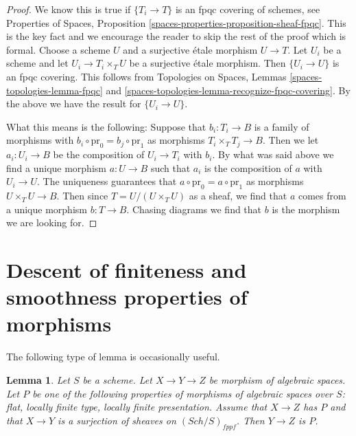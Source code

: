 \documentclass{stacks-project}
\theoremstyle{plain}
\newtheorem{lemma}[subsection]{Lemma}
\theoremstyle{definition}
\theoremstyle{remark}
\numberwithin{equation}{subsection}
\def\Sch{\mathit{Sch}}
\begin{document}
\begin{proof}
We know this is true if $\{T_i \to T\}$ is an fpqc covering of
schemes, see Properties of Spaces, Proposition
\ref{spaces-properties-proposition-sheaf-fpqc}.
This is the key fact and we encourage the reader to skip the rest
of the proof which is formal. Choose a scheme $U$ and a surjective
\'etale morphism
$U \to T$. Let $U_i$ be a scheme and let $U_i \to T_i \times_T U$
be a surjective \'etale morphism. Then $\{U_i \to U\}$ is an
fpqc covering. This follows from
Topologies on Spaces, Lemmas \ref{spaces-topologies-lemma-fpqc} and
\ref{spaces-topologies-lemma-recognize-fpqc-covering}.
By the above we have the result for $\{U_i \to U\}$.

\medskip\noindent
What this means is the following: Suppose that $b_i : T_i \to B$
is a family of morphisms with
$b_i \circ \text{pr}_0 = b_j \circ \text{pr}_1$ as morphisms
$T_i \times_T T_j \to B$. Then we let $a_i : U_i \to B$ be the
composition of $U_i \to T_i$ with $b_i$. By what was said above
we find a unique morphism $a : U \to B$ such that
$a_i$ is the composition of $a$ with $U_i \to U$.
The uniqueness guarantees that $a \circ \text{pr}_0 = a \circ \text{pr}_1$
as morphisms $U \times_T U \to B$. Then since $T = U/(U \times_T U)$
as a sheaf, we find that $a$ comes from a unique morphism $b : T \to B$.
Chasing diagrams we find that $b$ is the morphism we are looking for.
\end{proof}










\section{Descent of finiteness and smoothness properties of morphisms}
\label{section-descent-finiteness-morphisms}

\noindent
The following type of lemma is occasionally useful.

\begin{lemma}
\label{lemma-curiosity}
Let $S$ be a scheme. Let $X \to Y \to Z$ be morphism of algebraic spaces.
Let $P$ be one of the following properties of morphisms of algebraic spaces
over $S$:
flat, locally finite type, locally finite presentation.
Assume that $X \to Z$ has $P$ and that
$X \to Y$ is a surjection of sheaves on $(\Sch/S)_{fppf}$.
Then $Y \to Z$ is $P$.
\end{lemma}
\end{document}
